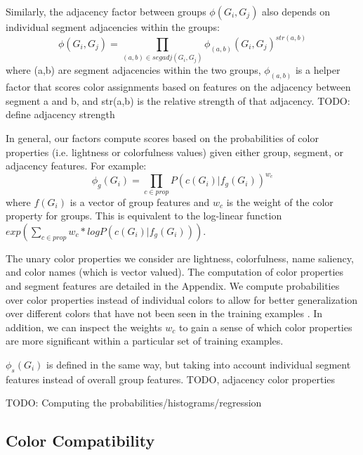 
Similarly, the adjacency factor between groups $\phi(G_i, G_j)$ also depends on individual segment adjacencies within the groups:
\begin{equation}
\phi(G_i, G_j) = \prod_{(a,b) \in segadj(G_i, G_j)}^{} \phi_{(a,b)}(G_i, G_j)^{str(a,b)}
\end{equation}
where (a,b) are segment adjacencies within the two groups, $\phi_{(a,b)}$ is a helper factor that scores color assignments based on features on the adjacency between segment a and b, and str(a,b) is the relative strength of that adjacency.
TODO: define adjacency strength

In general, our factors compute scores based on the probabilities of color properties (i.e. lightness or colorfulness values) given either group, segment, or adjacency features. For example: 
\begin{equation}
\phi_g(G_i) = \prod_{c \in prop}P(c(G_i)|f_g(G_i))^{w_c}
\end{equation}
where $f(G_i)$ is a vector of group features and $w_c$ is the weight of the color property for groups. This is equivalent to the log-linear function $exp\left(\sum_{c \in prop} w_c * logP(c(G_i)|f_g(G_i))\right)$.

The unary color properties we consider are lightness, colorfulness, name saliency, and color names (which is vector valued). The computation of color properties and segment features are detailed in the Appendix.
We compute probabilities over color properties instead of individual colors to allow for better generalization over different colors that have not been seen in the training examples . In addition, we can inspect the weights $w_c$ to gain a sense of which color properties are more significant within a particular set of training examples.

$\phi_s(G_i)$ is defined in the same way, but taking into account individual segment features instead of overall group features.
TODO, adjacency color properties


TODO: Computing the probabilities/histograms/regression



\subsection{Color Compatibility}
\label{sec:colorCompat}

